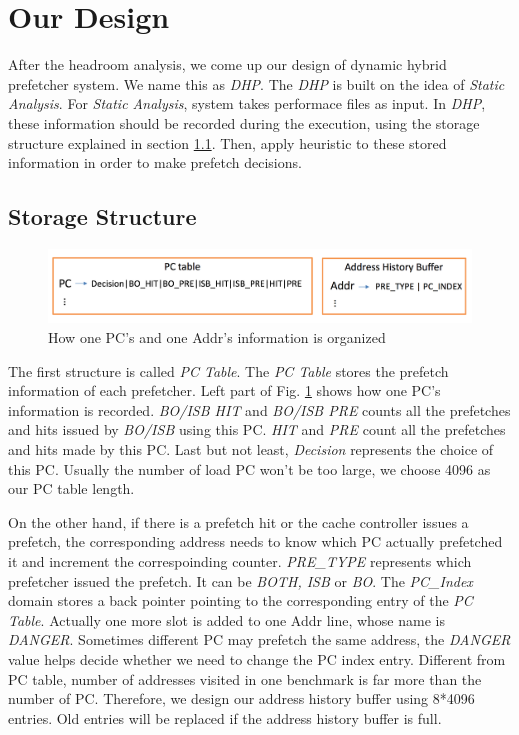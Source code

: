 \section{Our Design}
\label{sec:ourdesign}

After the headroom analysis, we come up our design of dynamic hybrid prefetcher system. We name this as \emph{DHP}. The \emph{DHP} is built on the idea of \emph{Static Analysis}. For \emph{Static Analysis}, system takes performace files as input. In \emph{DHP}, these information should be recorded during the execution, using the storage structure explained in section \ref{sec:storestruct}. Then, apply heuristic to these stored information in order to make prefetch decisions.

  \subsection{Storage Structure}
  \label{sec:storestruct}
  \begin{figure}[ht!]
	   \centering
	   \includegraphics[width=1.0\textwidth]{images/storage_struct.png}
	   \caption{How one PC's and one Addr's information is organized}
	   \label{fig:storage_struct}
  \end{figure}

  The first structure is called \emph{PC Table}. The \emph{PC Table} stores the prefetch information of each prefetcher. Left part of Fig. \ref{fig:storage_struct} shows how one PC's information is recorded. \emph{BO/ISB HIT} and \emph{BO/ISB PRE} counts all the prefetches and hits issued by \emph{BO/ISB} using this PC. \emph{HIT} and \emph{PRE} count all the prefetches and hits made by this PC. Last but not least, \emph{Decision} represents the choice of this PC. Usually the number of load PC won't be too large, we choose 4096 as our PC table length.

  On the other hand, if there is a prefetch hit or the cache controller issues a prefetch, the corresponding address needs to know which PC actually prefetched it and increment the correspoinding counter. \emph{PRE\_TYPE} represents which prefetcher issued the prefetch. It can be \emph{BOTH, ISB} or \emph{BO}. The \emph{PC\_Index} domain stores a back pointer pointing to the corresponding entry of the \emph{PC Table}. Actually one more slot is added to one Addr line, whose name is \emph{DANGER}. Sometimes different PC may prefetch the same address, the \emph{DANGER} value helps decide whether we need to change the PC index entry. Different from PC table, number of addresses visited in one benchmark is far more than the number of PC. Therefore, we design our address history buffer using 8*4096 entries. Old entries will be replaced if the address history buffer is full.


